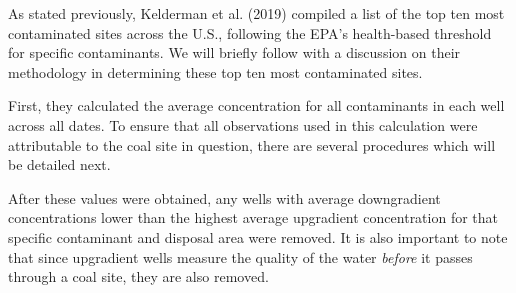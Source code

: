 \documentclass[12pt, twoside]{amherstthesis}
\begin{document}
As stated previously, Kelderman et al. (2019) compiled a list of the top ten most contaminated sites across the U.S., following the EPA's health-based threshold for specific contaminants. We will briefly follow with a discussion on their methodology in determining these top ten most contaminated sites.

First, they calculated the average concentration for all contaminants in each well across all dates. To ensure that all observations used in this calculation were attributable to the coal site in question, there are several procedures which will be detailed next.

After these values were obtained, any wells with average downgradient concentrations lower than the highest average upgradient concentration for that specific contaminant and disposal area were removed. It is also important to note that since upgradient wells measure the quality of the water \emph{before} it passes through a coal site, they are also removed.
\end{document}
